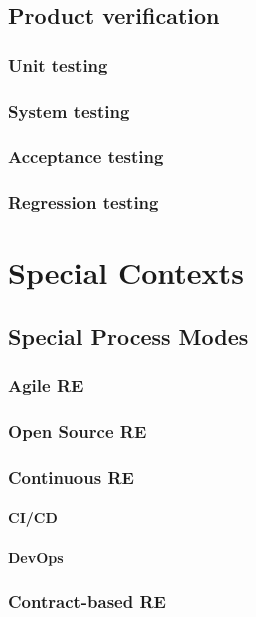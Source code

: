 \documentclass{reqengbook}
\begin{document}
\chapter{Product verification}
\section{Unit testing}
\section{System testing}
\section{Acceptance testing}
\section{Regression testing}

\part{Special Contexts}

\chapter{Special Process Modes}

\section{Agile RE}

\section{Open Source RE}

\section{Continuous RE}

\subsection{CI/CD}

\subsection{DevOps}



\section{Contract-based RE} 
\end{document}
